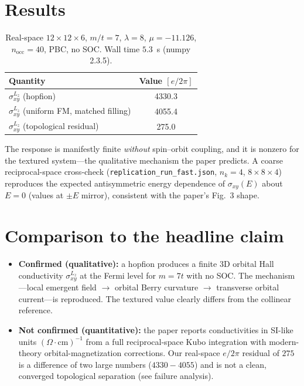 \documentclass[11pt]{article}
\begin{document}
\section{Results}
\begin{table}[h]
\centering
\begin{tabular}{lS}
\toprule
Quantity & {Value $[e/2\pi]$}\\
\midrule
$\sigma^{L_z}_{xy}$ (hopfion)              & 4330.3 \\
$\sigma^{L_z}_{xy}$ (uniform FM, matched filling) & 4055.4 \\
$\sigma^{L_z}_{xy}$ (topological residual) & 275.0 \\
\bottomrule
\end{tabular}
\caption{Real-space $12\times12\times6$, $m/t=7$, $\lambda=8$, $\mu=-11.126$,
$n_{\text{occ}}=40$, PBC, no SOC. Wall time $5.3$~s (numpy 2.3.5).}
\end{table}

The response is manifestly finite \emph{without} spin--orbit coupling, and it is
nonzero for the textured system---the qualitative mechanism the paper predicts. A
coarse reciprocal-space cross-check (\texttt{replication\_run\_fast.json}, $n_k=4$,
$8\times8\times4$) reproduces the expected antisymmetric energy dependence of
$\sigma_{xy}(E)$ about $E=0$ (values at $\pm E$ mirror), consistent with the paper's
Fig.~3 shape.

\section{Comparison to the headline claim}
\begin{itemize}
\item \textbf{Confirmed (qualitative):} a hopfion produces a finite 3D orbital Hall
conductivity $\sigma^{L_z}_{xy}$ at the Fermi level for $m=7t$ with no SOC. The
mechanism---local emergent field $\to$ orbital Berry curvature $\to$ transverse orbital
current---is reproduced. The textured value clearly differs from the collinear
reference.
\item \textbf{Not confirmed (quantitative):} the paper reports conductivities in
SI-like units $(\Omega\!\cdot\!\text{cm})^{-1}$ from a full reciprocal-space Kubo
integration with modern-theory orbital-magnetization corrections. Our real-space
$e/2\pi$ residual of $275$ is a difference of two large numbers ($4330-4055$) and is
not a clean, converged topological separation (see failure analysis).
\end{itemize}
\end{document}
